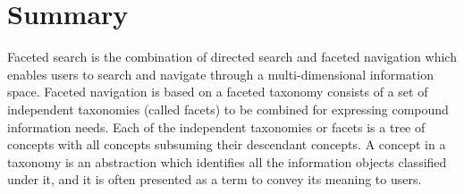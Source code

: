

\section{Summary}
Faceted search is the combination of directed search and faceted navigation which enables users to search and navigate through a multi-dimensional information space. Faceted navigation is based on a faceted taxonomy consists of a set of independent taxonomies (called facets) to be combined for expressing compound information needs. Each of the independent taxonomies or facets is a tree of concepts with all concepts subsuming their descendant concepts. A concept in a taxonomy is an abstraction which identifies all the information objects classified under it, and it is often presented as a term to convey its meaning to users.

